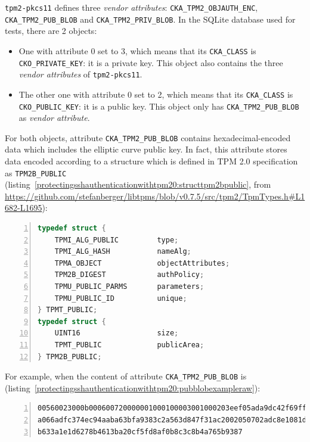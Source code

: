 \texttt{tpm2-pkcs11} defines three \emph{vendor
attributes}: \texttt{CKA\_TPM2\_OBJAUTH\_ENC},
\texttt{CKA\_TPM2\_PUB\_BLOB} and
\texttt{CKA\_TPM2\_PRIV\_BLOB}. In the SQLite database
used for tests, there are 2 objects:

\begin{itemize}

\item
  One with attribute 0 set to 3, which means that its
  \texttt{CKA\_CLASS} is
  \texttt{CKO\_PRIVATE\_KEY}: it is a private key. This
  object also contains the three \emph{vendor attributes} of
  \texttt{tpm2-pkcs11}.
\item
  The other one with attribute 0 set to 2, which means that its
  \texttt{CKA\_CLASS} is
  \texttt{CKO\_PUBLIC\_KEY}: it is a public key. This
  object only has \texttt{CKA\_TPM2\_PUB\_BLOB} as
  \emph{vendor attribute}.
\end{itemize}

For both objects, attribute
\texttt{CKA\_TPM2\_PUB\_BLOB} contains
hexadecimal-encoded data which includes the elliptic curve public key.
In fact, this attribute stores data encoded according to a structure
which is defined in TPM 2.0 specification as
\texttt{TPM2B\_PUBLIC}
(listing~\ref{protectingsshauthenticationwithtpm20:structtpm2bpublic},
from
\url{https://github.com/stefanberger/libtpms/blob/v0.7.5/src/tpm2/TpmTypes.h\#L1682-L1695}):

\begin{lstlisting}[language=C, numbers=left, caption={Structures \texttt{TPMT\_PUBLIC} and \texttt{TPM2B\_PUBLIC} from TPM 2.0 specification}, label=protectingsshauthenticationwithtpm20:structtpm2bpublic]
typedef struct {
    TPMI_ALG_PUBLIC         type;
    TPMI_ALG_HASH           nameAlg;
    TPMA_OBJECT             objectAttributes;
    TPM2B_DIGEST            authPolicy;
    TPMU_PUBLIC_PARMS       parameters;
    TPMU_PUBLIC_ID          unique;
} TPMT_PUBLIC;
typedef struct {
    UINT16                  size;
    TPMT_PUBLIC             publicArea;
} TPM2B_PUBLIC;
\end{lstlisting}

For example, when the content of attribute
\texttt{CKA\_TPM2\_PUB\_BLOB} is
(listing~\ref{protectingsshauthenticationwithtpm20:pubblobexampleraw}):

\begin{lstlisting}[numbers=left, caption={Example of generated public key blob}, label=protectingsshauthenticationwithtpm20:pubblobexampleraw]
00560023000b000600720000001000100003001000203eef05ada9dc42f69ffc
a066adfc374ec94aaba63bfa9383c2a563d847f31ac2002050702adc8e1081d1
b633a1e1d6278b4613ba20cf5fd8af0b8c3c8b4a765b9387
\end{lstlisting}

